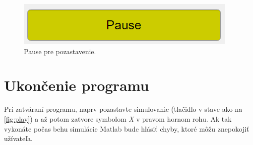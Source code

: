    	 \begin{figure}[h!]
	\centering
	\includegraphics[width=0.6\linewidth]{pause}
	\caption{Pause pre pozastavenie.}
	\label{fig:pause}
\end{figure} 

\section{Ukončenie programu}
Pri zatváraní programu, naprv pozastavte simulovanie (tlačidlo v stave ako na \cref{fig:play}) a až potom zatvore symbolom \textit{X} v pravom hornom rohu. Ak tak vykonáte počas behu simulácie Matlab bude hlásiť chyby, ktoré môžu znepokojiť užívateľa.

